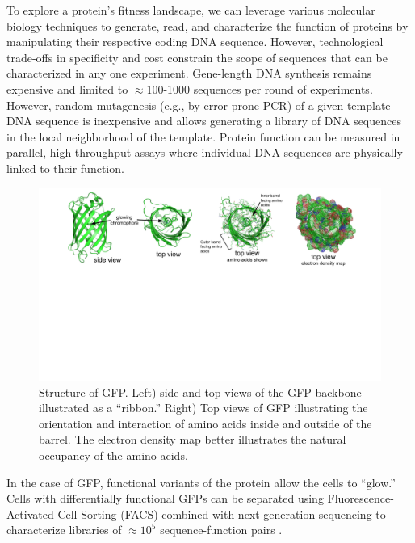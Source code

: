 To explore a protein’s fitness landscape, we can leverage various molecular biology techniques to generate, read, and characterize the function of proteins by manipulating their respective coding DNA sequence. However, technological trade-offs in specificity and cost constrain the scope of sequences that can be characterized in any one experiment. Gene-length DNA synthesis remains expensive and limited to $\approx$100-1000 sequences per round of experiments. However, random mutagenesis (e.g., by error-prone PCR) of a given template DNA sequence is inexpensive and allows generating a library of DNA sequences in the local neighborhood of the template. Protein function can be measured in parallel, high-throughput assays where individual DNA sequences are physically linked to their function.

\begin{figure}[t]
  \includegraphics[width=1\linewidth,page=1,trim={2cm 9cm 2cm 0}]{figures/2018-05-09-NIPS_2018_Figures.pdf}
  \caption{\small{
    Structure of GFP. Left) side and top views of the GFP backbone illustrated as a ``ribbon.'' Right) Top views of GFP illustrating the orientation and interaction of amino acids inside and outside of the barrel. The electron density map better illustrates the natural occupancy of the amino acids.}
  }
  \label{gfp-struct}
  \vspace{-0.6cm}
\end{figure}

In the case of GFP, functional variants of the protein allow the cells to ``glow.'' Cells with differentially functional GFPs can be separated using Fluorescence-Activated Cell Sorting (FACS) combined with next-generation sequencing to characterize libraries of $\approx10^5$ sequence-function pairs \cite{Kosuri2013-vt, Sarkisyan2016-cr}.

